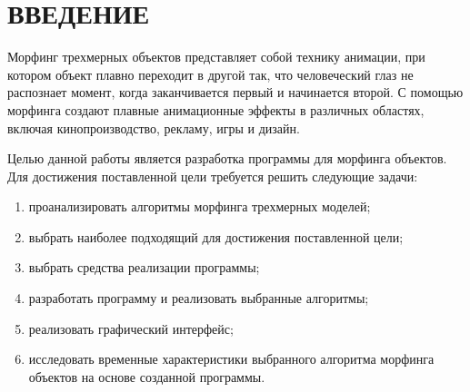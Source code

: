 \chapter*{ВВЕДЕНИЕ}

Морфинг трехмерных объектов представляет собой технику анимации, при котором объект плавно переходит в другой так, что человеческий глаз не распознает момент, когда заканчивается первый и начинается второй. С помощью морфинга создают плавные анимационные эффекты в различных областях, включая кинопроизводство, рекламу, игры и дизайн. 

Целью данной работы является разработка программы для морфинга объектов. Для достижения поставленной цели требуется решить следующие задачи:

\begin{enumerate}[label={\arabic*)}]
\item проанализировать алгоритмы морфинга трехмерных моделей;
\item выбрать наиболее подходящий для достижения поставленной цели;
\item выбрать средства реализации программы;
\item разработать программу и реализовать выбранные алгоритмы;
\item реализовать графический интерфейс;
\item исследовать временные характеристики выбранного алгоритма морфинга объектов на основе созданной программы.
\end{enumerate}